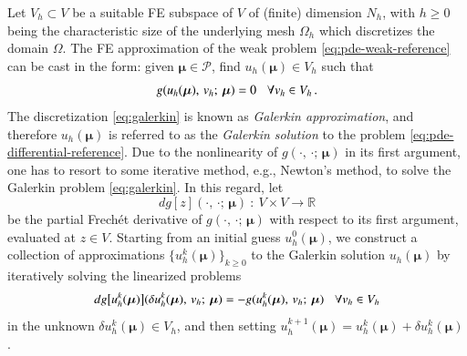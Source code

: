 \documentclass{elsarticle}
\numberwithin{equation}{section}
\theoremstyle{theorem}
\theoremstyle{definition}
\theoremstyle{remark}
\theoremstyle{proposition}
\numberwithin{figure}{section}
\newcommand{\bg}[1]{\boldsymbol{#1}}
\begin{document}
		Let $V_h \subset V$ be a suitable FE subspace of $V$ of (finite) dimension $N_h$, with $h \geq 0$ being the characteristic size of the underlying mesh $\Omega_h$ which discretizes the domain $\Omega$. The FE approximation of the weak problem \eqref{eq:pde-weak-reference} can be cast in the form: given $\bg{\mu} \in \mathcal{P}$, find $u_h(\bg{\mu}) \in V_h$ such that 
		\begin{equation}
			\label{eq:galerkin}
			g(u_h(\bg{\mu}), \, v_h; \, \bg{\mu}) = 0 \hspace*{0.3cm} \forall v_h \in V_h \, .
		\end{equation}
		The discretization \eqref{eq:galerkin} is known as \emph{Galerkin approximation}, and therefore $u_h(\bg{\mu})$ is referred to as the \emph{Galerkin solution} to the problem \eqref{eq:pde-differential-reference}. Due to the nonlinearity of $g(\cdot, \, \cdot; \, \bg{\mu})$ in its first argument, one has to resort to some iterative method, e.g., Newton's method, to solve the Galerkin problem \eqref{eq:galerkin}. In this regard, let \[ dg[z](\cdot, \, \cdot; \, \bg{\mu}) ~ : ~ V \times V \rightarrow \mathbb{R} \]
		be the partial Frech\'et derivative of $g(\cdot, \, \cdot; \, \bg{\mu})$ with respect to its first argument, evaluated at $z \in V$. Starting from an initial guess $u_h^0(\bg{\mu})$, we construct a collection of approximations $\big\lbrace u_h^k(\bg{\mu}) \big\rbrace_{k \geq 0}$ to the Galerkin solution $u_h(\bg{\mu})$ by iteratively solving the linearized problems
		\begin{equation*}
			\label{eq:newton-linearized-problem}
			dg \big[ u_h^k(\bg{\mu}) \big](\delta u_h^k(\bg{\mu}), \, v_h; \, \bg{\mu}) = - g(u_h^k(\bg{\mu}), \, v_h; \, \bg{\mu}) \hspace*{0.3cm} \forall v_h \in V_h
		\end{equation*}
		in the unknown $\delta u_h^k(\bg{\mu}) \in V_h$, and then setting $u_h^{k+1}(\bg{\mu}) = u_h^k(\bg{\mu}) + \delta u_h^k(\bg{\mu})$.
		
\end{document}
